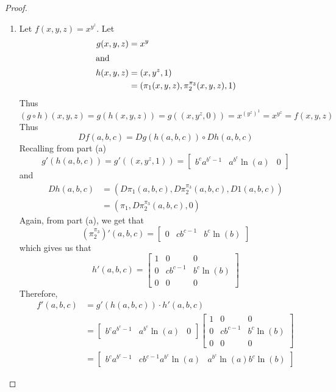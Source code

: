 \begin{enumerate}
\begin{proof}
\begin{enumerate}
        \item Let \( f(x,y,z) = x^{y^z} \). Let
        \begin{align*}
            g(x,y,z) &= x^y \\
            \intertext{and}
            h(x,y,z) &= (x, y^z , 1) \\
            &= (\pi_1(x,y,z), \pi_2^{\pi_3}(x,y,z), 1)
        \end{align*}
        Thus 
        \[
        (g \circ h)(x,y,z) = g(h(x,y,z)) = g((x,y^z,0)) = x^{(y^z)^1} = x^{y^z} = f(x,y,z)
        \]
        Thus
        \[
        Df(a,b,c) = Dg(h(a,b,c)) \circ Dh(a,b,c)
        \]
        Recalling from part (a)
        \[
        g'(h(a,b,c)) = g'((x,y^z,1)) = \left[ \begin{array}{ccc} b^ca^{b^c-1} & a^{b^c}\ln(a) & 0 \end{array} \right]
        \]
        and
        \begin{align*}
            Dh(a,b,c) &= \left( D\pi_1(a,b,c), D\pi_2^{\pi_3}(a,b,c), D1(a,b,c) \right) \\
            &= \left( \pi_1, D\pi_2^{\pi_3}(a,b,c), 0 \right)
        \end{align*}
        Again, from part (a), we get that
        \[
        \left( \pi_2^{\pi_3} \right)'(a,b,c) = \left[ \begin{array}{ccc} 0 & cb^{c-1} & b^c\ln(b)  \end{array} \right]
        \]
        which gives us that
        \[
        h'(a,b,c) = \left[ \begin{array}{ccc} 1 & 0 & 0 \\ 0 & cb^{c-1} & b^c \ln(b) \\ 0 & 0 & 0 \end{array} \right]
        \]
        Therefore,
        \begin{align*}
            f'(a,b,c) &= g'(h(a,b,c)) \cdot h'(a,b,c) \\
            &= \left[ \begin{array}{ccc} b^ca^{b^c-1} & a^{b^c}\ln(a) & 0 \end{array} \right]  \left[ \begin{array}{ccc} 1 & 0 & 0 \\ 0 & cb^{c-1} & b^c\ln(b) \\ 0 & 0 & 0  \end{array} \right] \\
            &= \left[ \begin{array}{ccc} b^ca^{b^c-1} & cb^{c-1}a^{b^c}\ln(a) & a^{b^c}\ln(a)b^c\ln(b) \end{array}  \right]
        \end{align*}
    \end{enumerate}
    \end{proof}
    

\end{enumerate}
